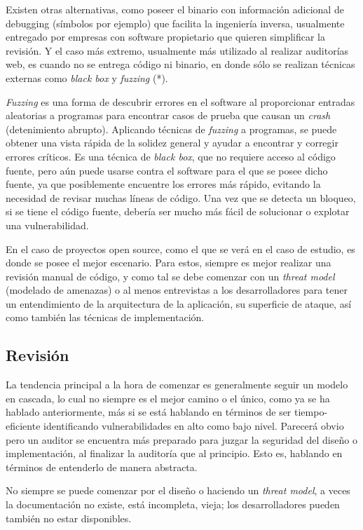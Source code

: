 Existen otras alternativas, como poseer el binario con información adicional de debugging (símbolos por ejemplo) que facilita la ingeniería inversa, usualmente entregado por empresas con software propietario que quieren simplificar la revisión. Y el caso más extremo, usualmente más utilizado al realizar auditorías web, es cuando no se entrega código ni binario, en donde sólo se realizan técnicas externas como \textit{black box} y \textit{fuzzing} (*).

\textit{Fuzzing} es una forma de descubrir errores en el software al proporcionar entradas aleatorias a programas para encontrar casos de prueba que causan un \textit{crash} (detenimiento abrupto). Aplicando técnicas de \textit{fuzzing} a programas, se puede obtener una vista rápida de la solidez general y ayudar a encontrar y corregir errores críticos. Es una técnica de \textit{black box}, que no requiere acceso al código fuente, pero aún puede usarse contra el software para el que se posee dicho fuente, ya que posiblemente encuentre los errores más rápido, evitando la necesidad de revisar muchas líneas de código. Una vez que se detecta un bloqueo, si se tiene el código fuente, debería ser mucho más fácil de solucionar o explotar una vulnerabilidad.

En el caso de proyectos open source, como el que se verá en el caso de estudio, es donde se posee el mejor escenario. Para estos, siempre es mejor realizar una revisión manual de código, y como tal se debe comenzar con un \textit{threat model} (modelado de amenazas) o al menos entrevistas a los desarrolladores para tener un entendimiento de la arquitectura de la aplicación, su superficie de ataque, así como también las técnicas de implementación.

\subsection{Revisión}
La tendencia principal a la hora de comenzar es generalmente seguir un modelo en cascada, lo cual no siempre es el mejor camino o el único, como ya se ha hablado anteriormente, más si se está hablando en términos de ser tiempo-eficiente identificando vulnerabilidades en alto como bajo nivel.
Parecerá obvio pero un auditor se encuentra más preparado para juzgar la seguridad del diseño o implementación, al finalizar la auditoría que al principio. Esto es, hablando en términos de entenderlo de manera abstracta.

No siempre se puede comenzar por el diseño o haciendo un \textit{threat model}, a veces la documentación no existe, está incompleta, vieja; los desarrolladores pueden también no estar disponibles.

